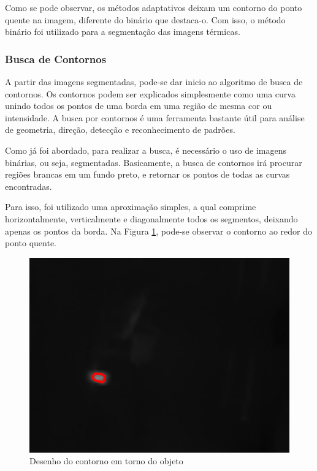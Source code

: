 		Como se pode observar, os métodos adaptativos deixam um contorno do ponto quente na imagem, diferente do binário que destaca-o. Com isso, o método binário foi utilizado para a segmentação das imagens térmicas.
		
		
		\subsubsection{Busca de Contornos}
		
		A partir das imagens segmentadas, pode-se dar inicio ao algoritmo de busca de contornos. Os contornos podem ser explicados simplesmente como uma curva unindo todos os pontos de uma borda em uma região de mesma cor ou intensidade. A busca por contornos é uma ferramenta bastante útil para análise de geometria, direção, detecção e reconhecimento de padrões.
		
		Como já foi abordado, para realizar a busca, é necessário o uso de imagens binárias, ou seja, segmentadas. Basicamente, a busca de contornos irá procurar regiões brancas em um fundo preto, e retornar os pontos de todas as curvas encontradas.
		
		Para isso, foi utilizado uma aproximação simples, a qual comprime horizontalmente, verticalmente e diagonalmente todos os segmentos, deixando apenas os pontos da borda. Na Figura \ref{fig:contour}, pode-se observar o contorno ao redor do ponto quente.
		
		\begin{figure}[!ht]
		   \centering
		   \includegraphics[width=12cm]{Figures/contorno.png}
		   \caption{Desenho do contorno em torno do objeto}
		   \label{fig:contour}
		\end{figure}
		
